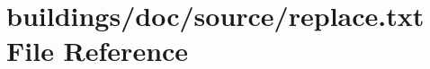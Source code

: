\hypertarget{buildings_2doc_2source_2replace_8txt}{}\section{buildings/doc/source/replace.txt File Reference}
\label{buildings_2doc_2source_2replace_8txt}
